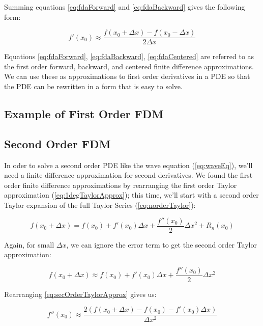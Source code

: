 {Summing equations \ref{eq:fdaForward} and \ref{eq:fdaBackward} gives the following form:
  
     \begin{equation}\label{eq:fdaCentered}
 f'(x_{0}) \approx \frac{f(x_{0} + \Delta  x) - f(x_{0} - \Delta  x)}{2\Delta x}
  \end{equation}

  Equations \ref{eq:fdaForward}, \ref{eq:fdaBackward}, \ref{eq:fdaCentered} are referred to as the first order forward, backward, and centered finite difference approximations.  We can use these as approximations to first order derivatives in a PDE so that the PDE can be rewritten in a form that is easy to solve.
  
\subsection{Example of First Order FDM}



\subsection{Second Order FDM}

In oder to solve a second order PDE like the wave equation (\ref{eq:waveEq}), we'll need a finite difference approximation for second derivatives.  We found the first order finite difference approximations by rearranging the first order Taylor approximation (\ref{eq:1degTaylorApprox}); this time, we'll start with a second order Taylor expansion of the full Taylor Series (\ref{eq:norderTaylor}):

 \begin{equation}
  f(x_{0} + \Delta  x) = f(x_{0}) + f'(x_{0})\Delta  x + \frac{f''(x_{0})}{2}\Delta  x^{2} + R_{n}(x_{0})
  \end{equation}
  
  Again, for small $\Delta  x$, we can ignore the error term to get the second order Taylor approximation:
  
   \begin{equation}\label{eq:secOrderTaylorApprox}
  f(x_{0} + \Delta  x) \approx f(x_{0}) + f'(x_{0})\Delta  x + \frac{f''(x_{0})}{2}\Delta  x^{2}
  \end{equation}
  
  Rearranging \ref{eq:secOrderTaylorApprox} gives us:
  
   \begin{equation}
   f''(x_{0}) \approx \frac{2( f(x_{0} + \Delta  x) - f(x_{0}) - f'(x_{0})\Delta  x)}{\Delta  x^{2}}
  \end{equation}
  
}
